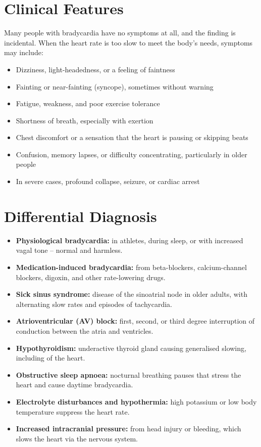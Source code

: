 \section*{Clinical Features}
Many people with bradycardia have no symptoms at all, and the finding is incidental. When the heart rate is too slow to meet the body's needs, symptoms may include:
\begin{itemize}
    \item Dizziness, light-headedness, or a feeling of faintness
    \item Fainting or near-fainting (syncope), sometimes without warning
    \item Fatigue, weakness, and poor exercise tolerance
    \item Shortness of breath, especially with exertion
    \item Chest discomfort or a sensation that the heart is pausing or skipping beats
    \item Confusion, memory lapses, or difficulty concentrating, particularly in older people
    \item In severe cases, profound collapse, seizure, or cardiac arrest
\end{itemize}

\section*{Differential Diagnosis}
\begin{itemize}
    \item \textbf{Physiological bradycardia:} in athletes, during sleep, or with increased vagal tone -- normal and harmless.
    \item \textbf{Medication-induced bradycardia:} from beta-blockers, calcium-channel blockers, digoxin, and other rate-lowering drugs.
    \item \textbf{Sick sinus syndrome:} disease of the sinoatrial node in older adults, with alternating slow rates and episodes of tachycardia.
    \item \textbf{Atrioventricular (AV) block:} first, second, or third degree interruption of conduction between the atria and ventricles.
    \item \textbf{Hypothyroidism:} underactive thyroid gland causing generalised slowing, including of the heart.
    \item \textbf{Obstructive sleep apnoea:} nocturnal breathing pauses that stress the heart and cause daytime bradycardia.
    \item \textbf{Electrolyte disturbances and hypothermia:} high potassium or low body temperature suppress the heart rate.
    \item \textbf{Increased intracranial pressure:} from head injury or bleeding, which slows the heart via the nervous system.
\end{itemize}

